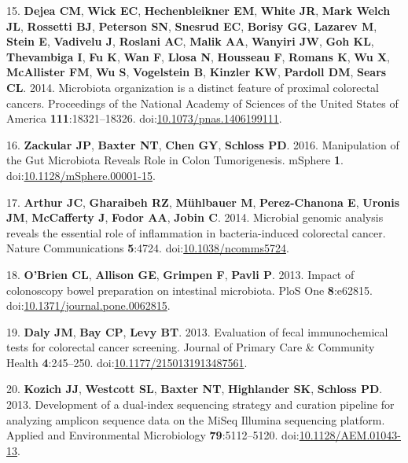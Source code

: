\documentclass[12pt,]{article}
\begin{document}
\hypertarget{ref-dejea_microbiota_2014}{}
15. \textbf{Dejea CM}, \textbf{Wick EC}, \textbf{Hechenbleikner EM},
\textbf{White JR}, \textbf{Mark Welch JL}, \textbf{Rossetti BJ},
\textbf{Peterson SN}, \textbf{Snesrud EC}, \textbf{Borisy GG},
\textbf{Lazarev M}, \textbf{Stein E}, \textbf{Vadivelu J},
\textbf{Roslani AC}, \textbf{Malik AA}, \textbf{Wanyiri JW}, \textbf{Goh
KL}, \textbf{Thevambiga I}, \textbf{Fu K}, \textbf{Wan F}, \textbf{Llosa
N}, \textbf{Housseau F}, \textbf{Romans K}, \textbf{Wu X},
\textbf{McAllister FM}, \textbf{Wu S}, \textbf{Vogelstein B},
\textbf{Kinzler KW}, \textbf{Pardoll DM}, \textbf{Sears CL}. 2014.
Microbiota organization is a distinct feature of proximal colorectal
cancers. Proceedings of the National Academy of Sciences of the United
States of America \textbf{111}:18321--18326.
doi:\href{https://doi.org/10.1073/pnas.1406199111}{10.1073/pnas.1406199111}.

\hypertarget{ref-zackular_manipulation_2016}{}
16. \textbf{Zackular JP}, \textbf{Baxter NT}, \textbf{Chen GY},
\textbf{Schloss PD}. 2016. Manipulation of the Gut Microbiota Reveals
Role in Colon Tumorigenesis. mSphere \textbf{1}.
doi:\href{https://doi.org/10.1128/mSphere.00001-15}{10.1128/mSphere.00001-15}.

\hypertarget{ref-arthur_microbial_2014}{}
17. \textbf{Arthur JC}, \textbf{Gharaibeh RZ}, \textbf{Mühlbauer M},
\textbf{Perez-Chanona E}, \textbf{Uronis JM}, \textbf{McCafferty J},
\textbf{Fodor AA}, \textbf{Jobin C}. 2014. Microbial genomic analysis
reveals the essential role of inflammation in bacteria-induced
colorectal cancer. Nature Communications \textbf{5}:4724.
doi:\href{https://doi.org/10.1038/ncomms5724}{10.1038/ncomms5724}.

\hypertarget{ref-obrien_impact_2013}{}
18. \textbf{O'Brien CL}, \textbf{Allison GE}, \textbf{Grimpen F},
\textbf{Pavli P}. 2013. Impact of colonoscopy bowel preparation on
intestinal microbiota. PloS One \textbf{8}:e62815.
doi:\href{https://doi.org/10.1371/journal.pone.0062815}{10.1371/journal.pone.0062815}.

\hypertarget{ref-daly_evaluation_2013}{}
19. \textbf{Daly JM}, \textbf{Bay CP}, \textbf{Levy BT}. 2013.
Evaluation of fecal immunochemical tests for colorectal cancer
screening. Journal of Primary Care \& Community Health
\textbf{4}:245--250.
doi:\href{https://doi.org/10.1177/2150131913487561}{10.1177/2150131913487561}.

\hypertarget{ref-kozich_development_2013}{}
20. \textbf{Kozich JJ}, \textbf{Westcott SL}, \textbf{Baxter NT},
\textbf{Highlander SK}, \textbf{Schloss PD}. 2013. Development of a
dual-index sequencing strategy and curation pipeline for analyzing
amplicon sequence data on the MiSeq Illumina sequencing platform.
Applied and Environmental Microbiology \textbf{79}:5112--5120.
doi:\href{https://doi.org/10.1128/AEM.01043-13}{10.1128/AEM.01043-13}.
\end{document}
